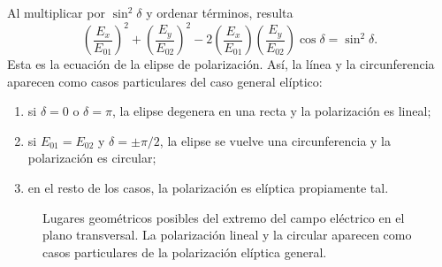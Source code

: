 \documentclass[12pt,a4paper]{article}
\theoremstyle{definition}
\theoremstyle{plain}
\numberwithin{equation}{section}
\theoremstyle{remark}
\begin{document}
Al multiplicar por $\sin^2\delta$ y ordenar términos, resulta
\begin{equation*}
    \left(\frac{E_x}{E_{01}}\right)^2+
    \left(\frac{E_y}{E_{02}}\right)^2-
    2\left(\frac{E_x}{E_{01}}\right)\left(\frac{E_y}{E_{02}}\right)\cos\delta
    =\sin^2\delta.
\end{equation*}
Esta es la ecuación de la elipse de polarización. Así, la línea y la circunferencia aparecen como casos particulares del caso general elíptico:
\begin{enumerate}[label=\arabic*.]
    \item si $\delta=0$ o $\delta=\pi$, la elipse degenera en una recta y la polarización es lineal;
    \item si $E_{01}=E_{02}$ y $\delta=\pm\pi/2$, la elipse se vuelve una circunferencia y la polarización es circular;
    \item en el resto de los casos, la polarización es elíptica propiamente tal.
\end{enumerate}

\begin{figure}[ht]
    \centering
    \begingroup
    \shorthandoff{<>}
    \endgroup
    \caption{Lugares geométricos posibles del extremo del campo eléctrico en el plano transversal. La polarización lineal y la circular aparecen como casos particulares de la polarización elíptica general.}
\end{figure}
\end{document}
